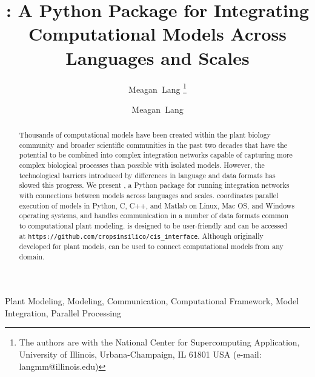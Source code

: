 \documentclass[journal]{IEEEtran}
\newcommand{\todo}[1]{{\color{red}{#1}}}
\newcommand{\pkg}{{\tt \todo{cis\_interface}}{}}
\begin{document}
\ifieee
\else
	\shorttitle{{\pkg}}
\fi

\title{{\pkg}: A Python Package for Integrating Computational Models Across Languages and Scales}

\ifieee
	\author{Meagan~Lang%
	\thanks{The authors are with the National Center for Supercomputing Application, University of Illinois, Urbana-Champaign, IL 61801 USA (e-mail: langmm@illinois.edu)}}
\else
	\author{Meagan~Lang}

\fi


\ifieee
	\maketitle
\fi

\begin{abstract}
Thousands of computational models have been created within the plant biology community and broader scientific communities in the past two decades that have the potential to be combined into complex integration networks capable of capturing more complex biological processes than possible with isolated models. However, the technological barriers introduced by differences in language and data formats has slowed this progress. We present \href{https://github.com/cropsinsilico/cis_interface}{\pkg}, a Python package for running integration networks with connections between models across languages and scales. {\pkg} coordinates parallel execution of models in Python, C, C++, and Matlab on Linux, Mac OS, and Windows operating systems, and handles communication in a number of data formats common to computational plant modeling. {\pkg} is designed to be user-friendly and can be accessed at {\tt https://github.com/cropsinsilico/cis\_interface}. Although originally developed for plant models, {\pkg} can be used to connect computational models from any domain.
\end{abstract}

\ifieee
	\begin{IEEEkeywords}
		Plant Modeling, Modeling, Communication, Computational Framework, Model Integration, Parallel Processing
	\end{IEEEkeywords}
	\IEEEpeerreviewmaketitle
\else
	\maketitle
\fi
\end{document}
